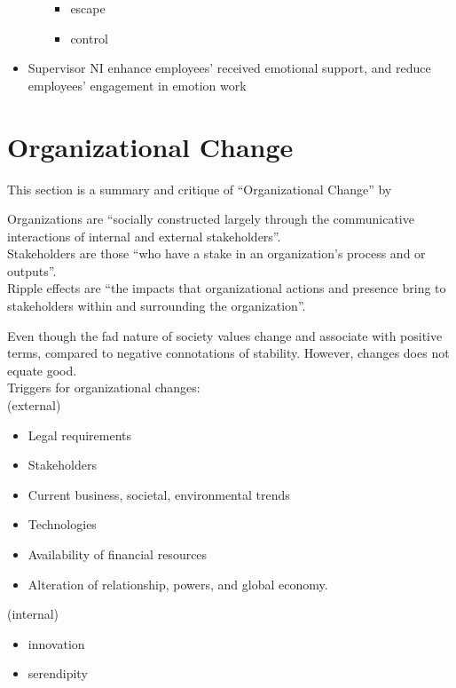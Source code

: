 \documentclass[
]{book}
\providecommand{\tightlist}{%
  \setlength{\itemsep}{0pt}\setlength{\parskip}{0pt}}
\begin{document}
\begin{itemize}
\begin{itemize}
    \begin{itemize}
    \item
      escape
    \item
      control
    \end{itemize}
  \end{itemize}
\item
  Supervisor NI enhance employees' received emotional support, and reduce employees' engagement in emotion work
\end{itemize}

\hypertarget{organizational-change}{%
\chapter{Organizational Change}\label{organizational-change}}

This section is a summary and critique of ``Organizational Change'' by \citep{Lewis_2019}

Organizations are ``socially constructed largely through the communicative interactions of internal and external
stakeholders''.\\
Stakeholders are those ``who have a stake in an organization's process and or outputs''.\\
Ripple effects are ``the impacts that organizational actions and presence bring to stakeholders within and surrounding
the organization''.

Even though the fad nature of society values change and associate with positive terms, compared to negative connotations
of stability. However, changes does not equate good.\\
Triggers for organizational changes:\\
(external)

\begin{itemize}
\tightlist
\item
  Legal requirements
\item
  Stakeholders
\item
  Current business, societal, environmental trends
\item
  Technologies
\item
  Availability of financial resources
\item
  Alteration of relationship, powers, and global economy.
\end{itemize}

(internal)

\begin{itemize}
\tightlist
\item
  innovation
\item
  serendipity
\end{itemize}
\end{document}

